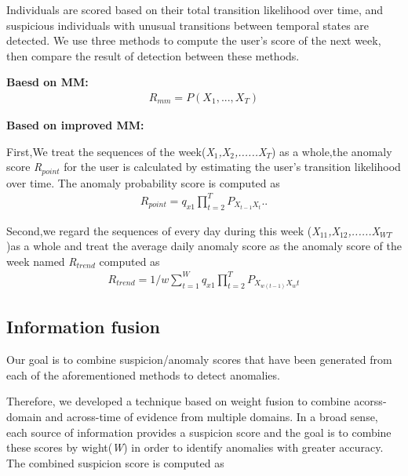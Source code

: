 \documentclass[conference]{IEEEtran}
\begin{document}
Individuals are scored based on their total transition likelihood over time, and suspicious individuals with unusual transitions between temporal states are detected. We use three methods to compute the user’s score of the next week, then compare the result of detection between these methods.

\textbf{Baesd on MM:}
\begin{align}
R_{mm} = P(X_1,...,X_T)
\end{align}


\textbf{Based on improved MM:}

First,We treat the sequences of the week(\emph{X$_1$,X$_2$,......X$_T$}) as a whole,the anomaly score \emph{R$_{point}$} for the user is calculated by estimating the user’s transition likelihood over time. The anomaly probability score is computed as
\begin{align}
R_{point}=q_{x1}\prod_{t=2}^T P_{X_{t-1}X_t}..
\end{align}

Second,we regard the sequences of every day during this week (\emph{X$_{11}$,X$_{12}$,......X$_{WT}$})as a whole and treat the average daily anomaly score as the anomaly score of the week named \emph{R$_{trend}$} computed as 
\begin{align}
R_{trend}=1/w\sum_{t=1}^W {q_{x1}\prod_{t=2}^T P_{X_{w(t-1)}X_wt}}
\end{align}


\subsection{Information fusion}

Our goal is to combine suspicion/anomaly scores that have been generated from each of the aforementioned methods to detect anomalies.

Therefore, we developed a technique based on weight fusion to combine acorss-domain and across-time of evidence from multiple domains. In a broad sense, each source of information provides a suspicion score and the goal is to combine these scores by wight(\emph{W}) in order to identify anomalies with greater accuracy. The combined suspicion score is computed as
\end{document}

